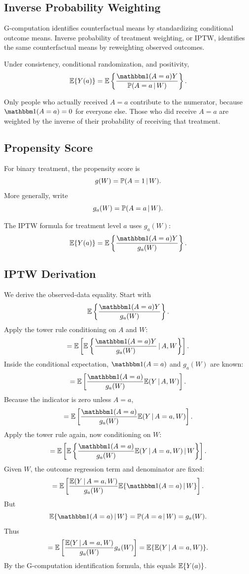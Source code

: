 \label{lec:3-8}

\subsection{Inverse Probability Weighting}

G-computation identifies counterfactual means by standardizing conditional outcome means. Inverse probability of treatment weighting, or IPTW, identifies the same counterfactual means by reweighting observed outcomes.

\begin{definition}
Under consistency, conditional randomization, and positivity,
\[
\E\{\Ya{a}\}
=
\E\left\{
\frac{\ind(A=a)Y}{\Prob(A=a\given W)}
\right\}.
\]
\end{definition}

Only people who actually received $A=a$ contribute to the numerator, because $\ind(A=a)=0$ for everyone else. Those who did receive $A=a$ are weighted by the inverse of their probability of receiving that treatment.

\subsection{Propensity Score}

\begin{definition}
For binary treatment, the propensity score is
\[
g(W)=\mathbb{P}(A=1\,\vert\, W).
\]
More generally, write
\[
g_a(W)=\mathbb{P}(A=a\,\vert\, W).
\]
\end{definition}

The IPTW formula for treatment level $a$ uses $g_a(W)$:
\[
\E\{\Ya{a}\}
=
\E\left\{\frac{\ind(A=a)Y}{g_a(W)}\right\}.
\]

\subsection{IPTW Derivation}

We derive the observed-data equality. Start with
\[
\E\left\{\frac{\ind(A=a)Y}{g_a(W)}\right\}.
\]
Apply the tower rule conditioning on $A$ and $W$:
\[
=
\E\left[
\E\left\{
\frac{\ind(A=a)Y}{g_a(W)}
\given A,W
\right\}
\right].
\]
Inside the conditional expectation, $\ind(A=a)$ and $g_a(W)$ are known:
\[
=
\E\left[
\frac{\ind(A=a)}{g_a(W)}
\E(Y\given A,W)
\right].
\]
Because the indicator is zero unless $A=a$,
\[
=
\E\left[
\frac{\ind(A=a)}{g_a(W)}
\E(Y\given A=a,W)
\right].
\]
Apply the tower rule again, now conditioning on $W$:
\[
=
\E\left[
\E\left\{
\frac{\ind(A=a)}{g_a(W)}
\E(Y\given A=a,W)
\given W
\right\}
\right].
\]
Given $W$, the outcome regression term and denominator are fixed:
\[
=
\E\left[
\frac{\E(Y\given A=a,W)}{g_a(W)}
\E\{\ind(A=a)\given W\}
\right].
\]
But
\[
\E\{\ind(A=a)\given W\}=\Prob(A=a\given W)=g_a(W).
\]
Thus
\[
=
\mathbb{E}\left[
\frac{\mathbb{E}(Y\,\vert\, A=a,W)}{g_a(W)}g_a(W)
\right]
=
\mathbb{E}\{\mathbb{E}(Y\,\vert\, A=a,W)\}.
\]
By the G-computation identification formula, this equals $\mathbb{E}\{Y(a)\}$.

